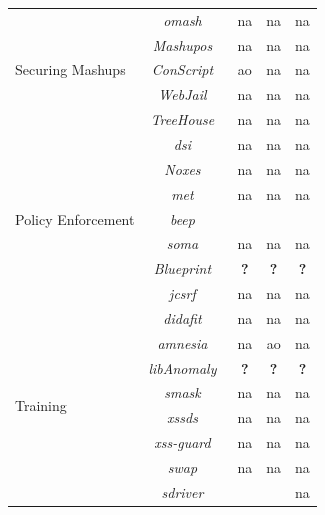 \documentclass[conference]{IEEEtran}
\newcommand{\tick}{\ding{52}}
\begin{document}
\begin{table}
\begin{threeparttable}
\begin{small}
{\begin{tabular}{l|c|ccc}
  \hline
  \hline 
  \multirow{5}{*}{Securing Mashups}
  &   {\it {\sc om}ash}~\cite{CHC08} & {\sc na} & {\sc na} & {\sc na} \\
  &   {\it Mashup{\sc os}}~\cite{WFHJ07} & {\sc na} & {\sc na} & {\sc na} \\
  &   {\it ConScript}~\cite{ML10} & {\sc ao} & {\sc na} & {\sc na} \\
  &   {\it WebJail}~\cite{VDDPJ11} & {\sc na} & {\sc na} & {\sc na} \\
  &   {\it TreeHouse}~\cite{IW12} & {\sc na} & {\sc na} & {\sc na} \\
  \hline
  \hline
	\multirow{7}{*}{Policy Enforcement}
	&   {\it {\sc dsi}}~\cite{NSS06} & {\sc na} & {\sc na} & {\sc na} \\
  &   {\it Noxes}~\cite{KKVJ06,KJKV09}  & {\sc na} & {\sc na} & {\sc na} \\
	&   {\it {\sc met}}~\cite{ELX07} & {\sc na} & {\sc na} & {\sc na} \\
  &   {\it {\sc beep}}~\cite{TNH07} & \tick & \tick & \tick \\
  &   {\it {\sc soma}}~\cite{OWVS08} & {\sc na} & {\sc na} & {\sc na} \\
	&   {\it Blueprint}~\cite{LV09} & {\bf ?} & {\bf ?} & {\bf ?} \\
	&   {\it j{\sc csrf}}~\cite{PS11} & {\sc na} & {\sc na} & {\sc na} \\
	\hline
	\hline  
        \multirow{9}{*}{Training}
  &   {\it {\sc didafit}}~\cite{LLW02} & {\sc na} & {\sc na} & {\sc na} \\
	&   {\it {\sc amnesia}}~\cite{HO05,HO06,HO05b} & {\sc na} & {\sc ao} & {\sc na} \\
	&   {\it libAnomaly}~\cite{VMV05} & {\bf ?} & {\bf ?} & {\bf ?} \\
	& 	{\it {\sc sm}ask}~\cite{JB07} & {\sc na} & {\sc na} & {\sc na} \\
	& 	{\it {\sc xssds}}~\cite{JEP08} & {\sc na} & {\sc na} & {\sc na} \\
  & 	{\it {\sc xss-guard}}~\cite{BV08} & {\sc na} & {\sc na} & {\sc na} \\
  & 	{\it {\sc swap}}~\cite{WPLKK09} & {\sc na} & {\sc na} & {\sc na} \\
	& 	{\it {\sc sd}river}~\cite{MS09,MKS09,MKLS11} & \tick & \tick & {\sc na} \\

\end{tabular}}
\end{small}
\end{threeparttable}
\end{table}
\end{document}
